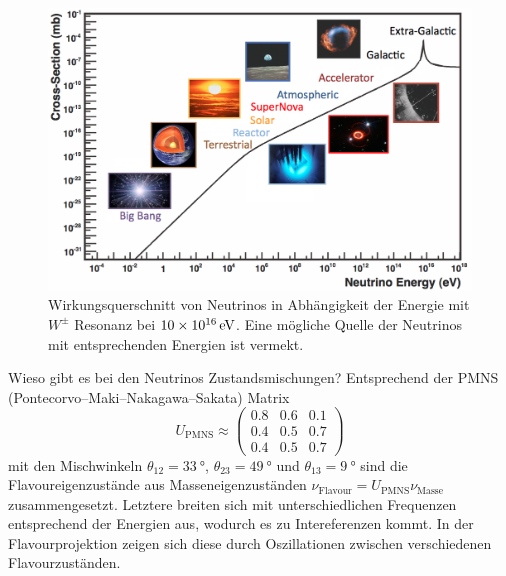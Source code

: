 \begin{figure}[!ht]
    \centering
    \includegraphics[width=\linewidth]{img/Neutrino_Wirkungswuerschnitt.png}
    \caption{Wirkungsquerschnitt von Neutrinos in Abhängigkeit der Energie mit $W^\pm$ Resonanz bei $\SI{10E16}{\electronvolt}$. Eine mögliche Quelle der Neutrinos mit entsprechenden Energien ist vermekt.
    }
\end{figure}

\begin{fquestion}{Wieso gibt es bei den Neutrinos Zustandsmischungen?}
    Entsprechend der PMNS (Pontecorvo–Maki–Nakagawa–Sakata) Matrix
    \[U_{\mathrm{PMNS}} \approx \begin{pmatrix}
        0.8 & 0.6 & 0.1 \\
        0.4 & 0.5 & 0.7 \\
        0.4 & 0.5 & 0.7 
    \end{pmatrix}\]
    mit den Mischwinkeln $\theta_{12} = \SI{33}{\degree}$, $\theta_{23} = \SI{49}{\degree}$ und $\theta_{13} = \SI{9}{\degree}$ sind die Flavoureigenzustände aus Masseneigenzuständen ${\nu_{\mathrm{Flavour}} = U_{\mathrm{PMNS}} \nu_{\mathrm{Masse}}}$ zusammengesetzt. 
    Letztere breiten sich mit unterschiedlichen Frequenzen entsprechend der Energien aus, wodurch es zu Intereferenzen kommt.
    In der Flavourprojektion zeigen sich diese durch Oszillationen zwischen verschiedenen Flavourzuständen.
\end{fquestion}

